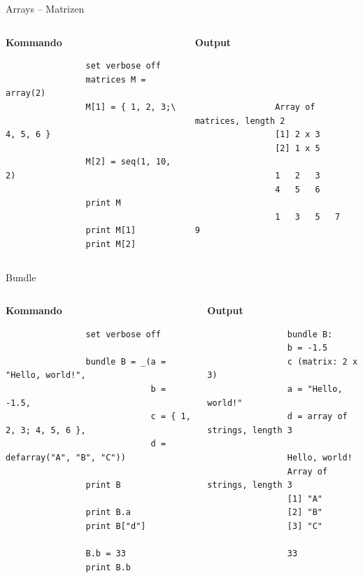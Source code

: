 \documentclass{beamer}[11pt]
\begin{document}
\begin{frame}[fragile]{Arrays -- Matrizen}
	\begin{columns}[T] %
		\begin{column}{.5\textwidth}
			\textbf{Kommando}
			\begin{verbatim}
				set verbose off
				matrices M = array(2)
				M[1] = { 1, 2, 3;\
							         4, 5, 6 }

				M[2] = seq(1, 10, 2)

				print M

				print M[1]
				print M[2]
			\end{verbatim}
		\end{column}

		\begin{column}{.5\textwidth}
			\textbf{Output}
			\begin{verbatim}



				Array of matrices, length 2
				[1] 2 x 3
				[2] 1 x 5

				1   2   3
				4   5   6

				1   3   5   7   9
			\end{verbatim}
	  \end{column}
	\end{columns}
\end{frame}


\begin{frame}[fragile]{Bundle}
	\small
	\begin{columns}[T] %
		\begin{column}{.55\textwidth}
			\textbf{Kommando}
			\begin{verbatim}
				set verbose off

				bundle B = _(a = "Hello, world!",
							 b = -1.5,
							 c = { 1, 2, 3; 4, 5, 6 },
							 d = defarray("A", "B", "C"))

				print B

				print B.a
				print B["d"]

				B.b = 33
				print B.b
			\end{verbatim}
		\end{column}

		\begin{column}{.45\textwidth}
			\textbf{Output}
			\begin{verbatim}
				bundle B:
				b = -1.5
				c (matrix: 2 x 3)
				a = "Hello, world!"
				d = array of strings, length 3

				Hello, world!
				Array of strings, length 3
				[1] "A"
				[2] "B"
				[3] "C"

				33
			\end{verbatim}
	  \end{column}
	\end{columns}
\end{frame}
\end{document}
